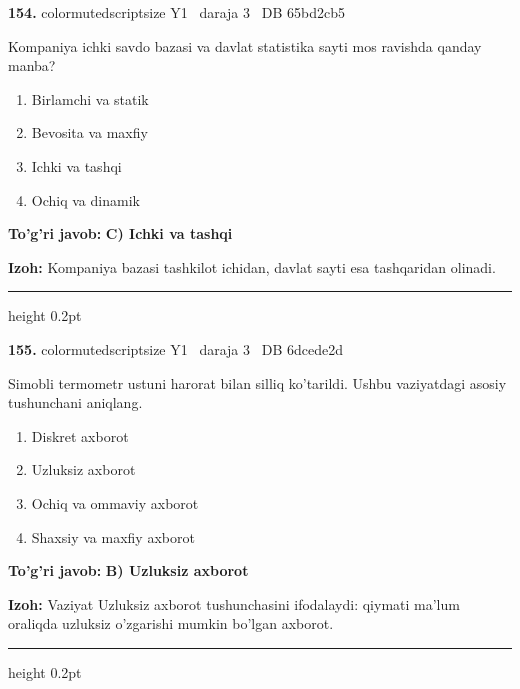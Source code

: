 \documentclass[10pt,a4paper,oneside]{article}
\begin{document}
\noindent\textbf{\color{ink}154.}  {color{muted}scriptsize Y1 \textbullet\ daraja 3 \textbullet\ DB 65bd2cb5}
\par
Kompaniya ichki savdo bazasi va davlat statistika sayti mos ravishda qanday manba?
\begin{enumerate}[label=\Alph*),leftmargin=9mm]
\item Birlamchi va statik
\item Bevosita va maxfiy
\item Ichki va tashqi
\item Ochiq va dinamik
\end{enumerate}
\begin{tcolorbox}[enhanced,breakable,colback=teal!4,colframe=teal!50!black,boxrule=0.5pt,arc=1.1mm,left=3mm,right=3mm,top=1.7mm,bottom=1.7mm,before skip=2mm,after skip=2mm]
\textbf{\color{teal}To'g'ri javob:} \textbf{C) Ichki va tashqi}
\par\smallskip
\textbf{Izoh:} Kompaniya bazasi tashkilot ichidan, davlat sayti esa tashqaridan olinadi.
\end{tcolorbox}
\vspace{2mm}\hrule height 0.2pt \vspace{3mm}

\noindent\textbf{\color{ink}155.}  {color{muted}scriptsize Y1 \textbullet\ daraja 3 \textbullet\ DB 6dcede2d}
\par
Simobli termometr ustuni harorat bilan silliq ko'tarildi. Ushbu vaziyatdagi asosiy tushunchani aniqlang.
\begin{enumerate}[label=\Alph*),leftmargin=9mm]
\item Diskret axborot
\item Uzluksiz axborot
\item Ochiq va ommaviy axborot
\item Shaxsiy va maxfiy axborot
\end{enumerate}
\begin{tcolorbox}[enhanced,breakable,colback=teal!4,colframe=teal!50!black,boxrule=0.5pt,arc=1.1mm,left=3mm,right=3mm,top=1.7mm,bottom=1.7mm,before skip=2mm,after skip=2mm]
\textbf{\color{teal}To'g'ri javob:} \textbf{B) Uzluksiz axborot}
\par\smallskip
\textbf{Izoh:} Vaziyat Uzluksiz axborot tushunchasini ifodalaydi: qiymati ma'lum oraliqda uzluksiz o'zgarishi mumkin bo'lgan axborot.
\end{tcolorbox}
\vspace{2mm}\hrule height 0.2pt \vspace{3mm}
\end{document}
